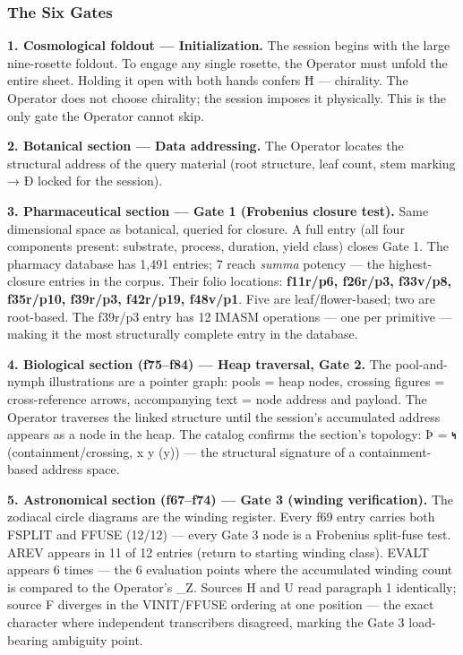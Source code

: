 \documentclass[12pt,a4paper]{article}
\begin{document}
\hypertarget{the-six-gates}{%
\subsubsection{The Six Gates}\label{the-six-gates}}

\textbf{1. Cosmological foldout --- Initialization.} The session begins
with the large nine-rosette foldout. To engage any single rosette, the
Operator must unfold the entire sheet. Holding it open with both hands
confers Ħ --- chirality. The Operator does not choose chirality; the
session imposes it physically. This is the only gate the Operator cannot
skip.

\textbf{2. Botanical section --- Data addressing.} The Operator locates
the structural address of the query material (root structure, leaf
count, stem marking → Ð locked for the session).

\textbf{3. Pharmaceutical section --- Gate 1 (Frobenius closure test).}
Same dimensional space as botanical, queried for closure. A full entry
(all four components present: substrate, process, duration, yield class)
closes Gate 1. The pharmacy database has 1,491 entries; 7 reach
\emph{summa} potency --- the highest-closure entries in the corpus.
Their folio locations: \textbf{f11r/p6, f26r/p3, f33v/p8, f35r/p10,
f39r/p3, f42r/p19, f48v/p1}. Five are leaf/flower-based; two are
root-based. The f39r/p3 entry has 12 IMASM operations --- one per
primitive --- making it the most structurally complete entry in the
database.

\textbf{4. Biological section (f75--f84) --- Heap traversal, Gate 2.}
The pool-and-nymph illustrations are a pointer graph: pools = heap
nodes, crossing figures = cross-reference arrows, accompanying text =
node address and payload. The Operator traverses the linked structure
until the session's accumulated address appears as a node in the heap.
The catalog confirms the section's topology: Þ = 𐑰
(containment/crossing, x \subseteq y \land {}(y)) --- the
structural signature of a containment-based address space.

\textbf{5. Astronomical section (f67--f74) --- Gate 3 (winding
verification).} The zodiacal circle diagrams are the winding register.
Every f69 entry carries both FSPLIT and FFUSE (12/12) --- every Gate 3
node is a Frobenius split-fuse test. AREV appears in 11 of 12 entries
(return to starting winding class). EVALT appears 6 times --- the 6
evaluation points where the accumulated winding count is compared to the
Operator's \Omega\_Z. Sources H and U read paragraph 1 identically;
source F diverges in the VINIT/FFUSE ordering at one position --- the
exact character where independent transcribers disagreed, marking the
Gate 3 load-bearing ambiguity point.
\end{document}
